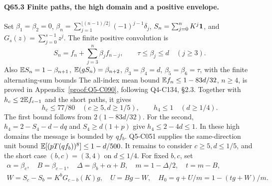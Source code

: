 \paragraph{Q65.3 Finite paths, the high domain and a positive envelope.}
Set \(\beta_1=\allowbreak \beta_2=\allowbreak 0\),
\(\beta_n=\allowbreak \sum_{j=\allowbreak 1}^{\lfloor(n-1)/2\rfloor}(-1)^{j-1}\delta_j\),
\(S_n=\allowbreak \sum_{j=\allowbreak 0}^nK^j\mathbf1\), and \(G_s(z)=\allowbreak \sum_{j=\allowbreak 0}^{s-1}z^j\).
The finite positive convolution is
\begin{equation}\tag{Q65.3.1}\label{eq:Q65:3.1}
S_n=f_n+\sum_{j=3}^n\beta_jf_{n-j},\qquad
\tau\le\beta_j\le d\quad(j\ge3).
\end{equation}
Also \(\mathbb E S_n=\allowbreak 1-\beta_{n+1}\), \(\mathbb E(gS_n)=\allowbreak \beta_{n+2}\),
\(\beta_3=\allowbreak \beta_4=\allowbreak d\), \(\beta_5=\allowbreak \beta_6=\allowbreak \tau\), with the finite
alternating-sum bounds
The all-index mean bound \(\mathbb E f_n\le\allowbreak 1-83d/32\), \(n\ge\allowbreak 4\),
is proved in Appendix~\ref{proof:Q5-C090}, following Q4-C134, \S2.3.
Together with \(h_c\le\allowbreak 2\mathbb E f_{c-1}\) and the short paths, it gives
\begin{equation}\tag{Q65.3.2}\label{eq:Q65:3.2}
h_c\le77/80\quad(c\ge5,d\ge1/5),\qquad
h_4\le1\quad(d\ge1/4).
\end{equation}
The first bound follows from \(2(1-83d/32)\).
For the second, \(h_4=\allowbreak 2-S_4-d-dq\) and \(S_4\ge\allowbreak  d(1+p)\)
give \(h_4\le\allowbreak 2-4d\le\allowbreak 1\).
In these high domains the message is bounded by \(qf_b\).
Q5-C051 supplies the same-direction unit bound
\(\mathbb E[(pT(qf_b))^8]\le\allowbreak 1-d/500\).
It remains to consider \(c\ge\allowbreak 5,\allowbreak d\le\allowbreak 1/5\), and the short case
\((b,\allowbreak c)=\allowbreak (3,\allowbreak 4)\) on \(d\le\allowbreak 1/4\).
For fixed \(b,\allowbreak c\), set
\begin{equation}\tag{Q65.3.3}\label{eq:Q65:3.3}
\begin{gathered}
\alpha=\beta_c,\quad B=\beta_{c-1},\quad
\Delta=\beta_b+\alpha+B,\quad m=1-\Delta/2,\quad t=m-B,\\
W=S_c-S_b=K^bG_{c-b}(K)g,\quad U=Bg-W,\quad
H_0=q+U/m=1-(tg+W)/m.
\end{gathered}
\end{equation}

